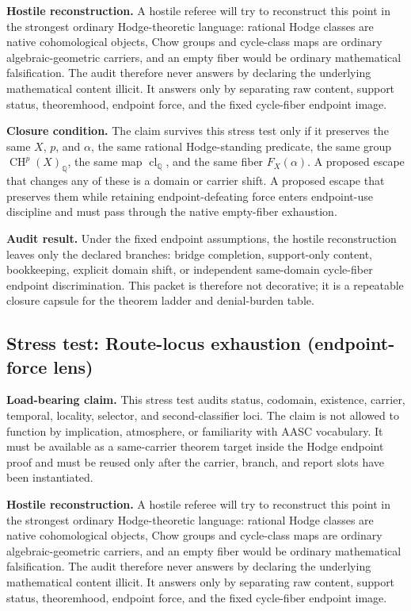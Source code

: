 \documentclass[11pt]{article}
\newcommand{\QQ}{\mathbb{Q}}
\newcommand{\CH}{\operatorname{CH}}
\newcommand{\clQ}{\operatorname{cl}_{\QQ}}
\begin{document}
\par\noindent\textbf{Hostile reconstruction.} A hostile referee will try to reconstruct this point in the strongest ordinary Hodge-theoretic language: rational Hodge classes are native cohomological objects, Chow groups and cycle-class maps are ordinary algebraic-geometric carriers, and an empty fiber would be ordinary mathematical falsification. The audit therefore never answers by declaring the underlying mathematical content illicit. It answers only by separating raw content, support status, theoremhood, endpoint force, and the fixed cycle-fiber endpoint image.

\par\noindent\textbf{Closure condition.} The claim survives this stress test only if it preserves the same $X$, $p$, and $\alpha$, the same rational Hodge-standing predicate, the same group $\CH^p(X)_\QQ$, the same map $\clQ$, and the same fiber $F_X(\alpha)$. A proposed escape that changes any of these is a domain or carrier shift. A proposed escape that preserves them while retaining endpoint-defeating force enters endpoint-use discipline and must pass through the native empty-fiber exhaustion.

\par\noindent\textbf{Audit result.} Under the fixed endpoint assumptions, the hostile reconstruction leaves only the declared branches: bridge completion, support-only content, bookkeeping, explicit domain shift, or independent same-domain cycle-fiber endpoint discrimination. This packet is therefore not decorative; it is a repeatable closure capsule for the theorem ladder and denial-burden table.


\subsection{Stress test: Route-locus exhaustion (endpoint-force lens)}

\par\noindent\textbf{Load-bearing claim.} This stress test audits status, codomain, existence, carrier, temporal, locality, selector, and second-classifier loci. The claim is not allowed to function by implication, atmosphere, or familiarity with AASC vocabulary. It must be available as a same-carrier theorem target inside the Hodge endpoint proof and must be reused only after the carrier, branch, and report slots have been instantiated.

\par\noindent\textbf{Hostile reconstruction.} A hostile referee will try to reconstruct this point in the strongest ordinary Hodge-theoretic language: rational Hodge classes are native cohomological objects, Chow groups and cycle-class maps are ordinary algebraic-geometric carriers, and an empty fiber would be ordinary mathematical falsification. The audit therefore never answers by declaring the underlying mathematical content illicit. It answers only by separating raw content, support status, theoremhood, endpoint force, and the fixed cycle-fiber endpoint image.
\end{document}

